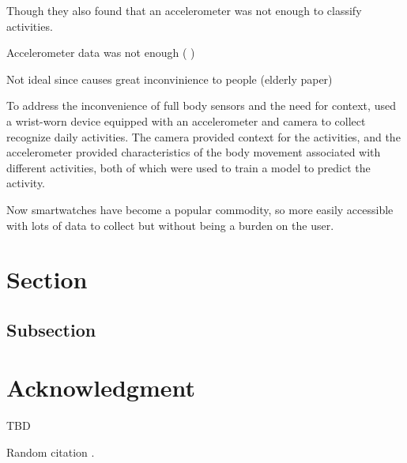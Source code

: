 \documentclass[conference]{IEEEtran}
\begin{document}
Though they also found that an accelerometer was not enough to classify activities.


Accelerometer data was not enough ( \cite{2011_Sensor_Positioning} )

Not ideal since causes great inconvinience to people (elderly paper)

To address the inconvenience of full body sensors and the need for context, \cite{2012_WristSense} used a wrist-worn device equipped with an accelerometer and camera to collect recognize daily activities.
The camera provided context for the activities, and the accelerometer provided characteristics of the body movement associated with different activities, both of which were used to train a model to predict the activity. 


Now smartwatches have become a popular commodity, so more easily accessible with lots of data to collect but without being a burden on the user.


\section{Section}

\subsection{Subsection}

\section*{Acknowledgment}
TBD

Random citation \cite{2022_Leveraging_sound}.

\nocite{*}
\printbibliography
\end{document}
